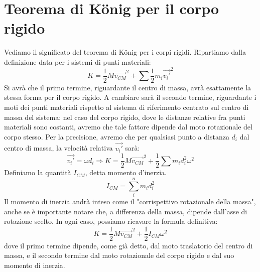 \documentclass[a4paper,12pt]{article}
\begin{document}
\section{Teorema di König per il corpo rigido}
Vediamo il significato del teorema di König per i corpi rigidi. Ripartiamo dalla definizione data per i sistemi
di punti materiali:
$$ K = \frac{1}{2}M\vec{v_{CM}}^2 + \sum \frac{1}{2}m_i\vec{v_i'}^2 $$
Si avrà che il primo termine, riguardante il centro di massa, avrà esattamente la stessa forma per il corpo rigido.
A cambiare sarà il secondo termine, riguardante i moti dei punti materiali rispetto al sistema di riferimento centrato
sul centro di massa del sistema: nel caso del corpo rigido, dove le distanze relative fra punti materiali sono costanti,
avremo che tale fattore dipende dal moto rotazionale del corpo stesso. Per la precisione, avremo che per qualsiasi
punto a distanza $d_i$ dal centro di massa, la velocità relativa $\vec{v_i'}$ sarà:
$$ \vec{v_i'} = \omega d_i \Rightarrow K = \frac{1}{2}M\vec{v_{CM}}^2 + \frac{1}{2}\sum m_id_i^2\omega^2$$
Definiamo la quantità $I_{CM}$, detta momento d'inerzia. 
$$ I_{CM} = \sum_i^n m_id_i^2 $$
Il momento di inerzia andrà inteso come il "corrispettivo rotazionale della massa", anche se è importante notare che, a differenza della massa, dipende dall'asse di rotazione scelto. In ogni caso,
possiamo ricavare la formula definitiva:
$$ K = \frac{1}{2}M\vec{v_{CM}}^2 + \frac{1}{2}I_{CM}\omega^2 $$
dove il primo termine dipende, come già detto, dal moto traslatorio del centro di massa, e il secondo termine dal moto rotazionale del corpo rigido e dal suo momento di inerzia.
\end{document}
